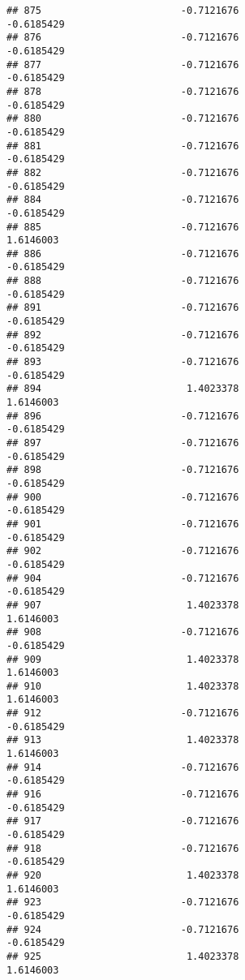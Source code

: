 \documentclass[
]{article}
\begin{document}
\begin{verbatim}
## 875                        -0.7121676                       -0.6185429
## 876                        -0.7121676                       -0.6185429
## 877                        -0.7121676                       -0.6185429
## 878                        -0.7121676                       -0.6185429
## 880                        -0.7121676                       -0.6185429
## 881                        -0.7121676                       -0.6185429
## 882                        -0.7121676                       -0.6185429
## 884                        -0.7121676                       -0.6185429
## 885                        -0.7121676                        1.6146003
## 886                        -0.7121676                       -0.6185429
## 888                        -0.7121676                       -0.6185429
## 891                        -0.7121676                       -0.6185429
## 892                        -0.7121676                       -0.6185429
## 893                        -0.7121676                       -0.6185429
## 894                         1.4023378                        1.6146003
## 896                        -0.7121676                       -0.6185429
## 897                        -0.7121676                       -0.6185429
## 898                        -0.7121676                       -0.6185429
## 900                        -0.7121676                       -0.6185429
## 901                        -0.7121676                       -0.6185429
## 902                        -0.7121676                       -0.6185429
## 904                        -0.7121676                       -0.6185429
## 907                         1.4023378                        1.6146003
## 908                        -0.7121676                       -0.6185429
## 909                         1.4023378                        1.6146003
## 910                         1.4023378                        1.6146003
## 912                        -0.7121676                       -0.6185429
## 913                         1.4023378                        1.6146003
## 914                        -0.7121676                       -0.6185429
## 916                        -0.7121676                       -0.6185429
## 917                        -0.7121676                       -0.6185429
## 918                        -0.7121676                       -0.6185429
## 920                         1.4023378                        1.6146003
## 923                        -0.7121676                       -0.6185429
## 924                        -0.7121676                       -0.6185429
## 925                         1.4023378                        1.6146003

\end{verbatim}
\end{document}
